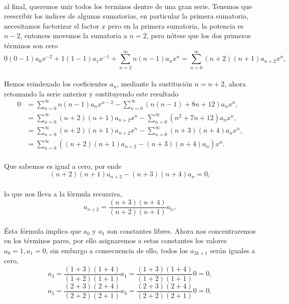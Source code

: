 \documentclass{article}
\begin{document}
\paragraph{} al final, queremos unir todos los terminos dentre de una gran serie. Tenemos que reescribir los indices de algunas sumatorias, en particular la primera sumatoria, necesitamos factorizar el factor $x$ pero en la primera sumatoria, la potencia es $n-2$, entonces movemos la  sumatoria a $n=2$, pero nótese que los dos primeros términos son cero
$$0(0-1)a_0x^{-2} + 1(1-1)a_1x^{-1} + \sum_{n=2}^{\infty} n(n-1)a_nx^n = \sum_{n=0}^{\infty} (n+2)(n+1)a_{n+2}x^n,$$
\paragraph{}Hemos reindexado los coeficientes $a_n$, mediante la sustitución  $n = n+2$, ahora retomando la serie anterior y sustituyendo este resultado
\begin{align*}
0 &= \sum_{n=0}^{\infty} n(n-1)a_n x^{n-2} - \sum_{n=0}^{\infty} (n(n-1) + 8n + 12)a_nx^n,\\
&= \sum_{n=0}^{\infty} (n+2)(n+1)a_{n+2} x^n - \sum_{n=0}^{\infty} (n^2 + 7n + 12)a_nx^n,\\
&= \sum_{n=0}^{\infty} (n+2)(n+1)a_{n+2} x^n - \sum_{n=0}^{\infty} (n+3)(n+4)a_nx^n,\\
&= \sum_{n=0}^{\infty} \left((n+2)(n+1)a_{n+2} - (n+3)(n+4)a_n\right)x^n.
\end{align*}
\paragraph{} Que sabemos es igual a cero, por ende
$$(n+2)(n+1)a_{n+2} - (n+3)(n+4)a_n = 0,$$
\paragraph{}lo que nos lleva a la fórmula recursiva,
\begin{equation}
a_{n+2} = \frac{(n+3)(n+4)}{(n+2)(n+1)} a_n \label{eq:5_recursion},
\end{equation}
\paragraph{} Ésta fórmula implica que $a_0$ y $a_1$ son constantes libres. Ahora nos concentraremos en los términos pares, por ello asignaremos a estas constantes los valores $a_0 = 1, a_1=0$, sin embargo a consecuencia de ello, todos los $a_{2k+1}$ serán iguales a cero,
$$a_3 = \frac{(1+3)(1+4)}{(1+2)(1+1)} a_1 = \frac{(1+3)(1+4)}{(1+2)(1+1)} 0 = 0,$$
$$a_5 = \frac{(2+3)(2+4)}{(2+2)(2+1)} a_3 = \frac{(2+3)(2+4)}{(2+2)(2+1)} 0 = 0,$$
\end{document}
